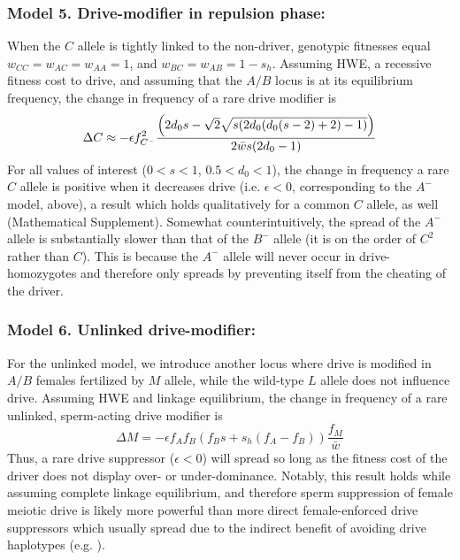 \documentclass{pnastwo}
\begin{document}
\begin{article}
 \subsubsection{Model 5. Drive-modifier in repulsion phase:}
When the $C$ allele is tightly linked to the non-driver, 
	genotypic fitnesses equal $w_{CC}=w_{AC}=w_{AA}=1$, and $w_{BC}=w_{AB}=1-s_h$. 
Assuming HWE, a recessive fitness cost to drive, and assuming that the $A/B$ locus is at its equilibrium frequency, the change in frequency of a rare drive modifier is
\begin{equation}
	\Delta C \approx -\epsilon f_{C^-}^2 \frac{ \left(2 d_0 s-\sqrt{2} \\ \sqrt{s (2 d_0 (d_0 (s-2)+2)-1)}\right)}{2\bar{w}s (2 d_0 -1) } \label{A-}
\end{equation}
For all values of interest ($0<s<1$, $0.5<d_0<1$), the change in frequency a rare $C$ allele is positive when it decreases drive (i.e. $\epsilon <0$, corresponding to the $A^-$ model, above), a result which holds qualitatively for a common $C$ allele, as well (Mathematical Supplement). 
Somewhat counterintuitively, the spread of the $A^-$ allele is substantially slower than that of the $B^-$ allele (it is on the order of $C^{2}$ rather than $C$). 
This is because the $A^-$ allele will never occur in drive-homozygotes and therefore only spreads by preventing itself from the cheating of the driver.

\subsubsection*{Model 6. Unlinked drive-modifier:}
For the unlinked model, we introduce another locus where drive is modified in $A/B$ females fertilized by $M$ allele, 
	while the wild-type $L$ allele does not influence drive. 
Assuming HWE and linkage equilibrium, the change in frequency of a rare unlinked, sperm-acting drive modifier is 
\begin{equation} \Delta M =-\epsilon f_A f_B (f_B s + s_h (f_A - f_B) ) \frac{f_M}{\bar{w}}  \label{unlinked} \end{equation}
Thus, a rare drive suppressor ($\epsilon<0$) will spread so long as the fitness cost of the driver does not display over- or under-dominance. 
Notably, this result holds while assuming complete linkage equilibrium, and therefore sperm suppression of female meiotic drive is likely more powerful than more direct female-enforced drive suppressors  which usually spread due to the indirect benefit of avoiding drive haplotypes (e.g. \cite{Brandvain2012}).  
 
\begin{acknowledgments} \end{acknowledgments}

\end{article}
\end{document}
